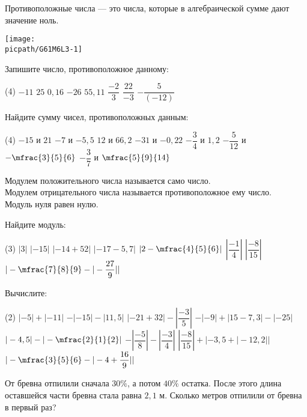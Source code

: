 \begin{class}[number=3]
	\begin{definit}
		Противоположные числа --- это числа, которые в алгебраической сумме дают значение ноль. \\
		\begin{minipage}[c]{0.45\textwidth}
			\texttt{[image: \\picpath/G61M6L3-1]}
		\end{minipage}
	\end{definit}
	\begin{listofex}
		\item Запишите число, противоположное данному:
		\begin{tasks}(4)
			\task \( -11  \)
			\task \( 25 \)
			\task \( 0,16 \)
			\task \( -26 \)
			\task \( 55,11 \)
			\task \( \dfrac{-2}{3} \)
			\task \( \dfrac{22}{-3} \)
			\task \( -\dfrac{5}{(-12)} \)
		\end{tasks}
		\item Найдите сумму чисел, противоположных данным:
		\begin{tasks}(4)
			\task \( -15  \) и \( 21 \)
			\task \( -7  \) и \( -5,5 \)
			\task \( 12  \) и \( 66,2 \)
			\task \( -31  \) и \( -0,22 \)
			\task \( -\dfrac{3}{4}  \) и \( 1,2 \)
			\task \( -\dfrac{5}{12}  \) и \( -\mfrac{3}{5}{6} \)
			\task \( -\dfrac{3}{7}  \) и \( \mfrac{5}{9}{14} \)
		\end{tasks}
	\end{listofex}
	\begin{definit}
	Модулем положительного числа называется само число. \\
	Модулем отрицательного числа называется противоположное ему число. \\
	Модуль нуля равен нулю.
	\end{definit}
	\begin{listofex}[resume]
		\item Найдите модуль:
		\begin{tasks}(3)
			\task \(  |3| \)
			\task \(  |-15| \)
			\task \( |-14+52|  \)
			\task \( |-17-5,7|  \)
			\task \(  |2-\mfrac{4}{5}{6}| \)
			\task \(  |\dfrac{-1}{4}| \)
			\task \(  |\dfrac{-8}{15}| \)
			\task \(  |-\mfrac{7}{8}{9} - |-\dfrac{27}{9}|| \)
		\end{tasks}
		\item Вычислите:
		\begin{tasks}(2)
			\task \(  |-5|+|-11| \)
			\task \(  -|-15|-|11,5| \)
			\task \( |-21+32| - |\dfrac{-3}{5}|  \)
			\task \( -|-9|+|15-7,3|-|-25|  \)
			\task \(  |-4,5|-|-\mfrac{2}{1}{2}| \)
			\task \(  -|\dfrac{-5}{8}|-|\dfrac{-3}{4}| \)
			\task \(  |\dfrac{-8}{15}| + |-3,5+|-12,2|| \)
			\task \(  |-\mfrac{3}{5}{6} - |-4+\dfrac{16}{9}|| \)
		\end{tasks}
		\item От бревна отпилили сначала \(30\%\), а потом \(40\%\) остатка. После этого длина оставшейся части бревна стала равна \(2,1\) м. Сколько метров отпилили от бревна в первый раз?
	\end{listofex}
\end{class}

